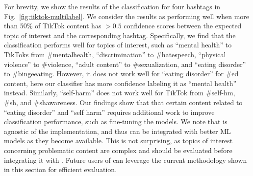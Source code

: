For brevity, we show the results of the classification for four hashtags in Fig.~\ref{fig:tiktok-multilabel}. 
We consider the results as performing well when more than 50\% of TikTok content has $> 0.5$ confidence scores between the expected topic of interest and the corresponding hashtag.
Specifically, we find that the classification performs well for topics of interest, such as ``mental health'' to TikToks from \#mentalhealth, ``discrimination'' to \#hatespeech, ``physical violence'' to \#violence, ``adult content'' to \#sexualization, and ``eating disorder'' to \#bingeeating. However, it does not work well for ``eating disorder'' for \#ed content, here our classifier has more confidence labeling it as ``mental health'' instead. Similarly, ``self-harm'' does not work well for TikTok from \#self-hm, \#sh, and \#shawareness. Our findings show that that certain content related to ``eating disorder'' and ``self harm'' requires additional work to improve classification performance, such as fine-tuning the models. We note that \autolike{} is agnostic of the implementation, and thus can be integrated with better ML models as they become available. This is not surprising, as topics of interest concerning problematic content are complex and should be evaluated before integrating it with \autolike{}. Future users of \autolike{} can leverage the current methodology shown in this section for efficient evaluation.




